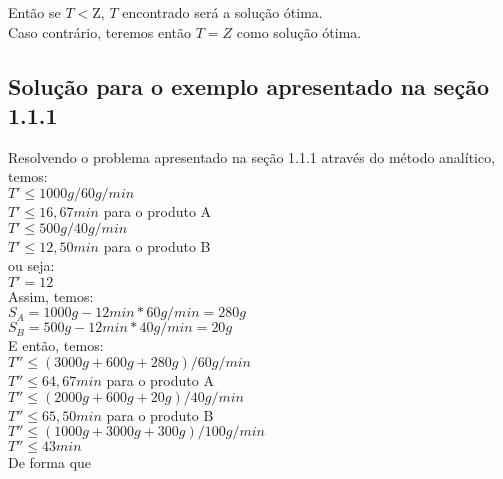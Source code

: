 \documentclass{book}
\begin{document}
Então se $T<\textrm{Z}$, $T$ encontrado será a solução ótima. \\

Caso contrário, teremos então $T=Z$ como solução ótima. \\

\subsection{Solução para o exemplo apresentado na seção 1.1.1}

Resolvendo o problema apresentado na seção 1.1.1 através do método analítico, temos: \\

$T' \leq 1000g / 60g/min$ \\

$T' \leq 16,67 min$ \quad para o produto A \\

$T' \leq 500g / 40g/min$ \\

$T' \leq 12,50 min$ \quad para o produto B \\

ou seja: \\

$T' = 12$ \\

Assim, temos:\\

$S_A = 1000g - 12min * 60g/min = 280g$ \\

$S_B = 500g - 12min * 40g/min = 20g$ \\

E então, temos: \\

$T'' \leq (3000g + 600g + 280g) / 60g/min$ \\

$T'' \leq 64,67 min$ \quad para o produto A \\

$T'' \leq (2000g + 600g + 20g) / 40g/min$ \\

$T'' \leq 65,50 min$ \quad para o produto B \\

$T'' \leq (1000g + 3000g + 300g) / 100g/min$ \\

$T'' \leq 43 min$ \\

De forma que \\
\end{document}
